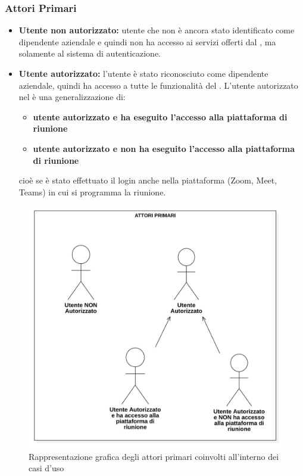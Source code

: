 \subsubsection{Attori Primari}
\begin{itemize}
    \item \textbf{Utente non autorizzato:} utente che non è ancora stato identificato come dipendente aziendale e quindi non ha accesso ai servizi offerti dal , ma solamente al sistema di autenticazione.
    \item \textbf{Utente autorizzato:} l'utente è stato riconosciuto come dipendente aziendale, quindi 
                ha accesso a tutte le funzionalità del . \newline
                L'utente autorizzato nel  è una generalizzazione di:
                \begin{itemize}
                \item \textbf{utente autorizzato e ha eseguito l'accesso alla piattaforma di riunione}
                \item \textbf{utente autorizzato e non ha eseguito l'accesso alla piattaforma di riunione}
                \end{itemize}
                cioè se è stato effettuato il login anche nella piattaforma (Zoom, Meet, Teams) in 
                cui si programma la riunione.
\end{itemize}
\begin{figure}[H]
    \centering
    \includegraphics[scale=0.35]{images/attori_primari.jpg} 
    \caption{Rappresentazione grafica degli attori primari coinvolti all'interno dei casi d'uso}
\end{figure}

